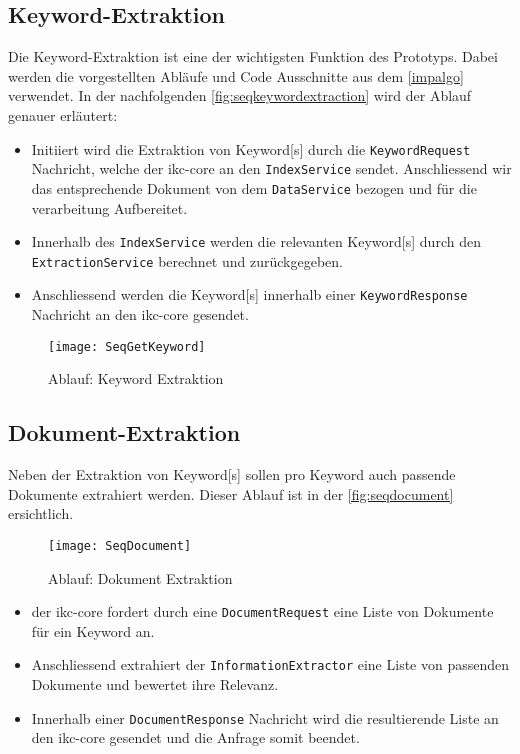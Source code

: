 \subsection{Keyword-Extraktion}
Die \gls{Keyword}-Extraktion ist eine der wichtigsten Funktion des Prototyps. Dabei werden die vorgestellten Abläufe und Code Ausschnitte aus dem \autoref{impalgo} verwendet. In der nachfolgenden \autoref{fig:seqkeywordextraction} wird der Ablauf genauer erläutert:
\begin{itemize}
    \item Initiiert wird die Extraktion von \gls{Keyword}[s] durch die \texttt{Key\-word\-Re\-qu\-est} Nachricht, welche der \gls{ikc-core} an den \texttt{IndexService} sendet. Anschliessend wir das entsprechende Dokument von dem \texttt{Da\-ta\-Ser\-vi\-ce} bezogen und für die verarbeitung Aufbereitet. 
    \item Innerhalb des \texttt{IndexService} werden die relevanten \gls{Keyword}[s] durch den \texttt{ExtractionService} berechnet und zurückgegeben.
    \item Anschliessend werden die \gls{Keyword}[s] innerhalb einer \texttt{Key\-word\-Re\-spon\-se} Nachricht an den \gls{ikc-core} gesendet.
\end{itemize}

    \begin{figure}[H]
    \centering
    \texttt{[image: SeqGetKeyword]}
    \caption{Ablauf: \gls{Keyword} Extraktion}
    \label{fig:seqkeywordextraction}
    \end{figure}

\subsection{Dokument-Extraktion}

Neben der Extraktion von \gls{Keyword}[s] sollen pro \gls{Keyword} auch passende Dokumente extrahiert werden. Dieser Ablauf ist in der \autoref{fig:seqdocument} ersichtlich.

    \begin{figure}[H]
    \centering
    \texttt{[image: SeqDocument]}
    \caption{Ablauf: Dokument Extraktion}
    \label{fig:seqdocument}
    \end{figure}

\begin{itemize}
    \item der \gls{ikc-core} fordert durch eine \texttt{DocumentRequest} eine Liste von Dokumente für ein \gls{Keyword} an. 
    \item Anschliessend extrahiert der \texttt{InformationExtractor} eine Liste von passenden Dokumente und bewertet ihre Relevanz. 
    \item Innerhalb einer \texttt{DocumentResponse} Nachricht wird die resultierende Liste an den \gls{ikc-core} gesendet und die Anfrage somit beendet.
\end{itemize}

